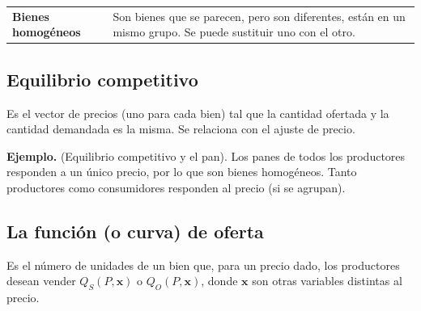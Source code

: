 \documentclass{report}
\newenvironment{example}[1]{\noindent\setlength{\parskip}{0pt}\textbf{Ejemplo.} (#1).}{}
\newenvironment{definition}[1]{\begin{center}
\begin{tabular}{p{3.5cm} p{12.5cm}}
\textbf{#1} &
}
{\\ \end{tabular}\end{center}}
\begin{document}
\begin{definition}{Bienes homogéneos}
Son bienes que se parecen, pero son diferentes, están en un mismo grupo. Se puede sustituir uno con el otro.
\end{definition}

\subsection{Equilibrio competitivo}

Es el vector de precios (uno para cada bien) tal que la cantidad ofertada y la cantidad demandada es la misma. Se relaciona con el ajuste de precio.

\begin{example}{Equilibrio competitivo y el pan}
Los panes de todos los productores responden a un único precio, por lo que son bienes homogéneos. Tanto productores como consumidores responden al precio (si se agrupan).
\end{example}

\subsection{La función (o curva) de oferta}

Es el número de unidades de un bien que, para un precio dado, los productores desean vender $Q_S\!\left(P,\mathbf{x}\right)$ o $Q_O\!\left(P,\mathbf{x}\right)$, donde $\mathbf{x}$ son otras variables distintas al precio.

\begin{center}
\end{center}
\end{document}
